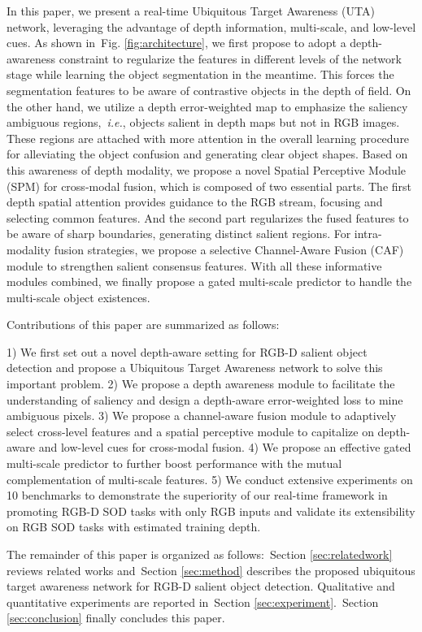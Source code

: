 \documentclass[journal]{IEEEtran}
\def\ie{{\em i.e.}}
\newcommand{\figref}[1]{Fig. \ref{#1}}
\newcommand{\secref}[1]{Section \ref{#1}}
\begin{document}
In this paper, we present a real-time Ubiquitous Target Awareness (UTA) network, leveraging the advantage of depth information, multi-scale, and low-level cues. As shown in~\figref{fig:architecture}, we first propose to adopt a depth-awareness constraint to regularize the features in different levels of the network stage while learning the object segmentation in the meantime. This forces the segmentation features to be aware of contrastive objects in the depth of field.
On the other hand, we utilize a depth error-weighted map to emphasize the saliency ambiguous regions,~\ie, objects salient in depth maps but not in RGB images. These regions are attached with more attention in the overall learning procedure for alleviating the object confusion and generating clear object shapes. Based on this awareness of depth modality, we propose a novel Spatial Perceptive Module (SPM) for cross-modal fusion, which is composed of two essential parts. The first depth spatial attention provides guidance to the RGB stream, focusing and selecting common features. And the second part regularizes the fused features to be aware of sharp boundaries, generating distinct salient regions. For intra-modality fusion strategies, we propose a selective Channel-Aware Fusion (CAF) module to strengthen salient consensus features. With all these informative modules combined, we finally propose a gated multi-scale predictor to handle the multi-scale object existences.

Contributions of this paper are summarized as follows:

1) We first set out a novel depth-aware setting for RGB-D salient object detection and propose a Ubiquitous Target Awareness network to solve this important problem. 2) We propose a depth awareness module to facilitate the understanding of saliency and design a depth-aware error-weighted loss to mine ambiguous pixels.  3) We propose a channel-aware fusion module to adaptively select cross-level features and a spatial perceptive module to capitalize on depth-aware and low-level cues for cross-modal fusion.
4) We propose an effective gated multi-scale predictor to further boost performance with the mutual complementation of multi-scale features.
5) We conduct extensive experiments on 10 benchmarks to demonstrate the superiority of our real-time framework in promoting RGB-D SOD tasks with only RGB inputs and validate its extensibility on RGB SOD tasks with estimated training depth.

The remainder of this paper is organized as follows:~\secref{sec:relatedwork} reviews related works and~\secref{sec:method} describes the proposed ubiquitous target awareness network for RGB-D salient object detection. Qualitative and quantitative experiments are reported in~\secref{sec:experiment}.~\secref{sec:conclusion} finally concludes this paper.
\end{document}
